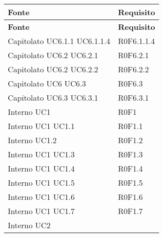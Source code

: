 \def\arraystretch{1.5}
\begin{longtable}{p{2.5cm}!{\VRule[1pt]}p{2.5cm}}
\color{white} \textbf{Fonte} & \color{white} \textbf{Requisito} \\ 
\endfirsthead 
{} 
\color{white} \textbf{Fonte} & \color{white} \textbf{Requisito} \\ 
\endhead 
Capitolato \newline UC6.1.1
 \newline UC6.1.1.4
 & R0F6.1.1.4 \\
Capitolato \newline UC6.2
 \newline UC6.2.1
 & R0F6.2.1 \\
Capitolato \newline UC6.2
 \newline UC6.2.2
 & R0F6.2.2 \\
Capitolato \newline UC6
 \newline UC6.3
 & R0F6.3 \\
Capitolato \newline UC6.3
 \newline UC6.3.1
 & R0F6.3.1 \\
Interno \newline UC1
 & R0F1 \\
Interno \newline UC1
 \newline UC1.1
 & R0F1.1 \\
Interno \newline UC1.2
 & R0F1.2 \\
Interno \newline UC1
 \newline UC1.3
 & R0F1.3 \\
Interno \newline UC1
 \newline UC1.4
 & R0F1.4 \\
Interno \newline UC1
 \newline UC1.5
 & R0F1.5 \\
Interno \newline UC1
 \newline UC1.6
 & R0F1.6 \\
Interno \newline UC1
 \newline UC1.7
 & R0F1.7 \\
Interno \newline UC2

\end{longtable}
